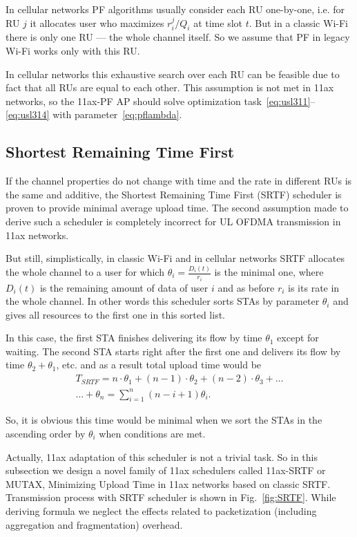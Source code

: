 In cellular networks PF algorithms usually consider each RU one-by-one, i.e. for RU $j$ it allocates user who maximizes $r_i^j / Q_i$ at time slot $t$. But in a classic Wi-Fi there is only one RU --- the whole channel itself. So we assume that PF in legacy Wi-Fi works only with this RU.

In cellular networks this exhaustive search over each RU can be feasible due to fact that all RUs are equal to each other. This assumption is not met in 11ax networks, so the 11ax-PF AP should solve optimization task~\eqref{eq:usl311}--\eqref{eq:usl314} with parameter~\eqref{eq:pflambda}.


\subsection{Shortest Remaining Time First}

If the channel properties do not change with time and the rate in different RUs is the same and additive, the Shortest Remaining Time First (SRTF) scheduler is proven to provide minimal average upload time. 
The second assumption made to derive such a scheduler is completely incorrect for UL OFDMA transmission in 11ax networks.

But still, simplistically, in classic Wi-Fi and in cellular networks SRTF allocates the whole channel to a user for which $\theta_i=\frac{D_i(t)}{r_i}$ is the minimal one, where $D_i(t)$ is the remaining amount of data of user $i$ and as before $r_i$ is its rate in the whole channel. 
In other words this scheduler sorts STAs by parameter $\theta_i$ and gives all resources to the first one in this sorted list. 

In this case, the first STA finishes delivering its flow by time $\theta_1$ except for waiting.
The second STA starts right after the first one and delivers its flow by time $\theta_2 + \theta_1$, etc. and as a result total upload time would be
\begin{multline}
\label{eq:srtfuploadtime}
T_{SRTF} = n\cdot\theta_1 + (n-1)\cdot\theta_2 + (n-2)\cdot\theta_3 + \dots \\ \dots + \theta_n = \sum_{i = 1}^n (n - i + 1) \theta_i.
\end{multline}

So, it is obvious this time would be minimal when we sort the STAs in the ascending order by $\theta_i$ when conditions are met.

Actually, 11ax adaptation of this scheduler is not a trivial task. So in this subsection we design a novel family of 11ax schedulers called 11ax-SRTF or MUTAX, Minimizing Upload Time in 11ax networks based on classic SRTF. Transmission process with SRTF scheduler is shown in Fig.~\ref{fig:SRTF}.
While deriving formula we neglect the effects related to packetization (including aggregation and fragmentation) overhead. 

